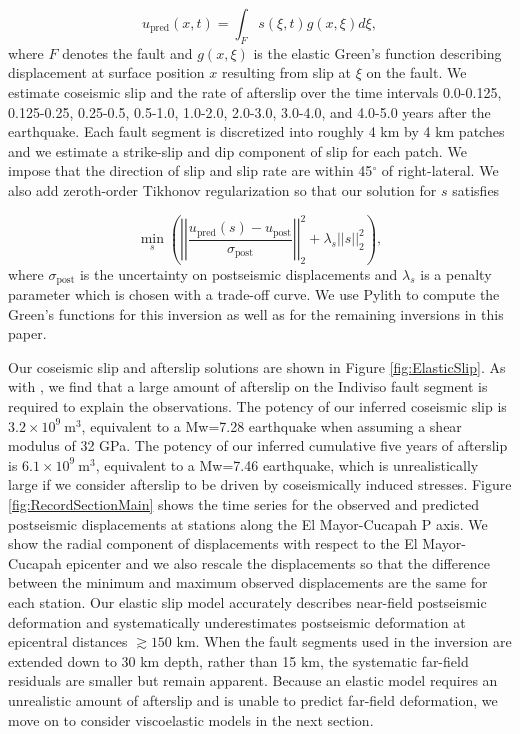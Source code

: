 \documentclass[draft,linenumbers]{AGUJournal}
\begin{document}
\begin{equation}\label{eq:ElasticForward}
  u_\mathrm{pred}(x,t) = \int_F s(\xi,t)g(x,\xi)d\xi, 
\end{equation}           
where $F$ denotes the fault and $g(x,\xi)$ is the elastic Green's function describing displacement at surface position $x$ resulting from slip at $\xi$ on the fault.  We estimate coseismic slip and the rate of afterslip over the time intervals 0.0-0.125, 0.125-0.25, 0.25-0.5, 0.5-1.0, 1.0-2.0, 2.0-3.0, 3.0-4.0, and 4.0-5.0 years after the earthquake.  Each fault segment is discretized into roughly 4 km by 4 km patches and we estimate a strike-slip and dip component of slip for each patch. We impose that the direction of slip and slip rate are within 45$^\circ$ of right-lateral. We also add zeroth-order Tikhonov regularization so that our solution for $s$ satisfies

\begin{equation}\label{eq:ElasticObjective}
  \min_s \left(\left|\left|\frac{u_\mathrm{pred}(s) - u_\mathrm{post}}                
                                {\sigma_\mathrm{post}}\right|\right|_2^2 + 
                                \lambda_s||s||_2^2\right),
\end{equation}
where $\sigma_\mathrm{post}$ is the uncertainty on postseismic displacements and $\lambda_s$ is a penalty parameter which is chosen with a trade-off curve.  We use Pylith \citep{Aagaard2013} to compute the Green's functions for this inversion as well as for the remaining inversions in this paper. 

Our coseismic slip and afterslip solutions are shown in Figure \ref{fig:ElasticSlip}.  As with \citet{Rollins2015}, we find that a large amount of afterslip on the Indiviso fault segment is required to explain the observations. The potency of our inferred coseismic slip is $3.2\times10^9\ \mathrm{m}^3$, equivalent to a Mw=7.28 earthquake when assuming a shear modulus of 32 GPa.  The potency of our inferred cumulative five years of afterslip is $6.1\times10^9\ \mathrm{m}^3$, equivalent to a Mw=7.46 earthquake, which is unrealistically large if we consider afterslip to be driven by coseismically induced stresses.  Figure \ref{fig:RecordSectionMain} shows the time series for the observed and predicted postseismic displacements at stations along the El Mayor-Cucapah P axis.  We show the radial component of displacements with respect to the El Mayor-Cucapah epicenter and we also rescale the displacements so that the difference between the minimum and maximum observed displacements are the same for each station.  Our elastic slip model accurately describes near-field postseismic deformation and systematically underestimates postseismic deformation at epicentral distances ${\gtrsim}150$ km.  When the fault segments used in the inversion are extended down to 30 km depth, rather than 15 km, the systematic far-field residuals are smaller but remain apparent. Because an elastic model requires an unrealistic amount of afterslip and is unable to predict far-field deformation, we move on to consider viscoelastic models in the next section.  
\end{document}
